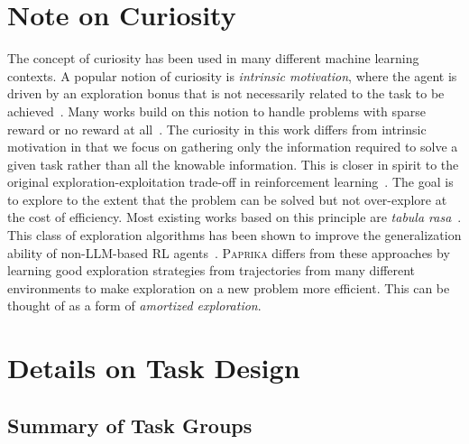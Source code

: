 \documentclass{article}
\newcommand{\ours}[1]{\textsc{Paprika}}
\theoremstyle{plain}
\theoremstyle{definition}
\theoremstyle{remark}
\begin{document}
\section{Note on Curiosity} \label{section:appendix_note_on_curiosity}
The concept of curiosity has been used in many different machine learning contexts. A popular notion of curiosity is \emph{intrinsic motivation}, where the agent is driven by an exploration bonus that is not necessarily related to the task to be achieved~\citep{schmidhuber1991curious, schmidhuber2007godel}. Many works build on this notion to handle problems with sparse reward or no reward at all~\citep{pathak2017curiosity, eysenbach2018diversity, burda2018exploration, sharma2019dynamics, pathak2019self}. The curiosity in this work differs from intrinsic motivation in that we focus on gathering only the information required to solve a given task rather than all the knowable information. This is closer in spirit to the original exploration-exploitation trade-off in reinforcement learning~\citep{sutton1998reinforcement, auer2002finite, thompson1933likelihood}. The goal is to explore to the extent that the problem can be solved but not over-explore at the cost of efficiency. Most existing works based on this principle are \emph{tabula rasa}~\citep{osband2016deep, chen2017ucb}.
This class of exploration algorithms has been shown to improve the generalization ability of non-LLM-based RL agents~\citep{jiang2023importance}.
\ours{} differs from these approaches by learning good exploration strategies from trajectories from many different environments to make exploration on a new problem more efficient. This can be thought of as a form of \emph{amortized exploration}.
\section{Details on Task Design} \label{section:appendix_environment_design}
\subsection{Summary of Task Groups}
\end{document}
